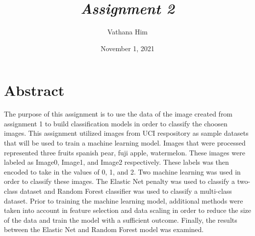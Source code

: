 \documentclass[12pt]{article}
\title{\Huge \bfseries \emph{Assignment 2}}
\author{Vathana Him}
\date{November 1, 2021}
\begin{document}
\maketitle
\section{Abstract}
\hspace*{5mm} The purpose of this assignment is to use the data of the image created from assignment 1 to build classification models in order to classify the choosen images. 
This assignment utilized images from UCI respository as sample datasets that will be used to train a machine learning model. 
Images that were processed represented three fruits spanish pear, fuji apple, watermelon. These images were labeled as Image0, Image1, and Image2 respectively. 
These labels was then encoded to take in the values of 0, 1, and 2. Two machine learning was used in order to classify these images. The Elastic
Net penalty was used to classify a two-class dataset and Random Forest classifier was used to classify a multi-class dataset. Prior to training the machine learning model,
additional methods were taken into account in feature selection and data scaling in order to reduce the size of the data and train the model with a sufficient outcome.
Finally, the results between the Elastic Net and Random Forest model was examined. 
\end{document}
